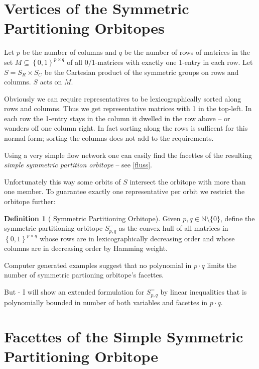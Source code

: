 \documentclass{amsart}
\theoremstyle{definition}
\newtheorem{defn}{Definition}
\begin{document}
\section{Vertices of the Symmetric Partitioning Orbitopes}
Let $p$ be the number of columns and $q$ be the number of rows of
matrices in the set \(M \subseteq \left\{0,1\right\}^{p\times q}\) of all
\(0/1\)-matrices with exactly one 1-entry in each row.  Let \(S = S_R
\times S_C\) be the Cartesian product of the symmetric groups on rows
and columns.  \(S\) acts on \(M\).


Obviously we can require representatives to be lexicographically
sorted along rows and columns.  Thus we get representative matrices
with 1 in the top-left.  In each row the 1-entry stays in the column
it dwelled in the row above -- or wanders off one column right.  In
fact sorting along the rows is sufficent for this normal form; sorting
the columns does not add to the requirements.

Using a very simple flow network one can easily find the facettes of
the resulting \textit{simple symmetric partition orbitope} -- see
\ref{fluss}.


Unfortunately this way some orbits of $S$ intersect the orbitope with
more than one member.  To guarantee exactly one representative per
orbit we restrict the orbitope further:

\begin{defn}[ Symmetric Partitioning Orbitope]
  \label{espo}
  Given \(p, q \in \mathbb{N} \setminus \{0\}\), define the 
  symmetric partitioning orbitope \(S^=_{p,q}\) as the convex hull of
  all matrices in \(\left\{0,1\right\}^{p\times q}\) whose rows are in
  lexicographically decreasing order and whose columns are in
  decreasing order by Hamming weight.
\end{defn}

Computer generated examples suggest that no polynomial in \(p \cdot
q\) limits the number of  symmetric partioning orbitope's
facettes.

But - I will show an extended formulation for \(S^=_{p,q}\) by linear
inequalities that is polynomially bounded in number of both variables
and facettes in \(p \cdot q\).


\section{Facettes of the Simple Symmetric Partitioning Orbitope}
\end{document}

